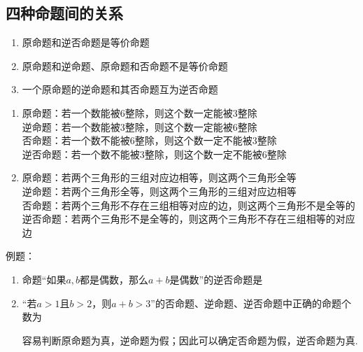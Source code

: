 \subsection*{四种命题间的关系}
\begin{enumerate}
    \item 原命题和逆否命题是等价命题
    \item 原命题和逆命题、原命题和否命题不是等价命题
    \item 一个原命题的逆命题和其否命题互为逆否命题
\end{enumerate}
\begin{example}
    \begin{enumerate}
        \item 原命题：若一个数能被6整除，则这个数一定能被3整除 \\
              逆命题：若一个数能被3整除，则这个数一定能被6整除 \\
              否命题：若一个数不能被6整除，则这个数一定不能被3整除 \\
              逆否命题：若一个数不能被3整除，则这个数一定不能被6整除
        \item 原命题：若两个三角形的三组对应边相等，则这两个三角形全等 \\
              逆命题：若两个三角形全等，则这两个三角形的三组对应边相等 \\
              否命题：若两个三角形不存在三组相等对应的边，则这两个三角形不是全等的 \\
              逆否命题：若两个三角形不是全等的，则这两个三角形不存在三组相等的对应边
    \end{enumerate}
\end{example}
例题：
\begin{enumerate}
    \item 命题“如果$a, b$都是偶数，那么$a+b$是偶数”的逆否命题是
    \item “若$a>1$且$b>2$，则$a+b>3$”的否命题、逆命题、逆否命题中正确的命题个数为
    \begin{jieda}
        容易判断原命题为真，逆命题为假；因此可以确定否命题为假，逆否命题为真.
    \end{jieda}
\end{enumerate}

